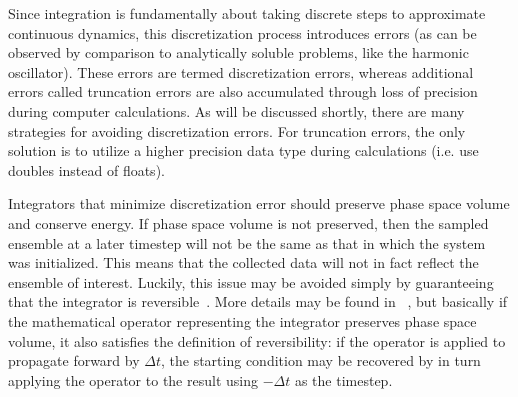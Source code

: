 \documentclass[9pt,bestpractices]{livecoms}
\begin{document}
Since integration is fundamentally about taking discrete steps to approximate continuous dynamics, this discretization process introduces errors (as can be observed by comparison to analytically soluble problems, like the harmonic oscillator).
These errors are termed discretization errors, whereas additional errors called truncation errors are also accumulated through loss of precision during computer calculations.
As will be discussed shortly, there are many strategies for avoiding discretization errors.
For truncation errors, the only solution is to utilize a higher precision data type during calculations (i.e. use doubles instead of floats).

Integrators that minimize discretization error should preserve phase space volume and conserve energy.
If phase space volume is not preserved, then the sampled ensemble at a later timestep will not be the same as that in which the system was initialized.
This means that the collected data will not in fact reflect the ensemble of interest.
Luckily, this issue may be avoided simply by guaranteeing that the integrator is reversible~\cite{Frenkel:2001:}.
More details may be found in ~\citet{Tuckerman:1992:}, but basically if the mathematical operator representing the integrator preserves phase space volume, it also satisfies the definition of reversibility: if the operator is applied to propagate forward by $\Delta t$, the starting condition may be recovered by in turn applying the operator to the result using $- \Delta t$ as the timestep.
\end{document}
